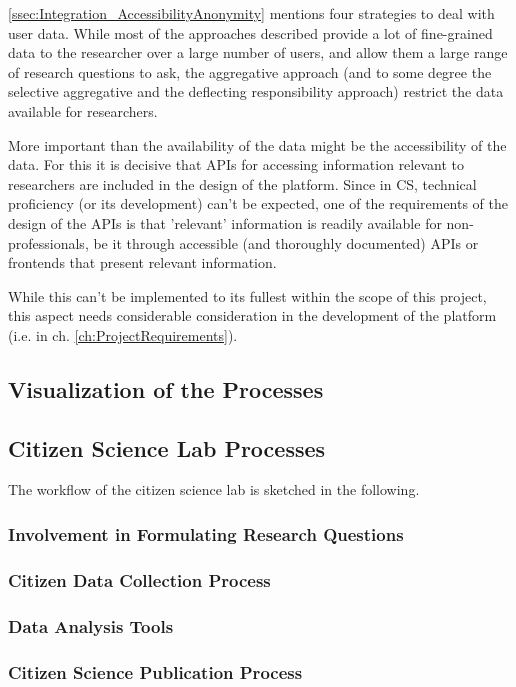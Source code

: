 \ref{ssec:Integration_AccessibilityAnonymity} mentions four strategies to deal with user data. While most of the approaches described provide a lot of fine-grained data to the researcher over a large number of users, and allow them a large range of research questions to ask, the aggregative approach (and to some degree the selective aggregative and the deflecting responsibility approach) restrict the data available for researchers. 

More important than the availability of the data might be the accessibility of the data. For this it is decisive that APIs for accessing information relevant to researchers are included in the design of the platform. Since in CS, technical proficiency (or its development) can't be expected, one of the requirements of the design of the APIs is that 'relevant' information is readily available for non-professionals, be it through accessible (and thoroughly documented) APIs or frontends that present relevant information.

While this can't be implemented to its fullest within the scope of this project, this aspect needs considerable consideration in the development of the platform (i.e. in ch. \ref{ch:ProjectRequirements}).

\subsection{Visualization of the Processes}
\label{sec:Model_Visualization}

\subsection{Citizen Science Lab Processes}
\label{sec:CSLab_Processes}


The workflow of the citizen science lab is sketched in the following.

\subsubsection{Involvement in Formulating Research Questions}

\subsubsection{Citizen Data Collection Process}

\subsubsection{Data Analysis Tools}

\subsubsection{Citizen Science Publication Process}
